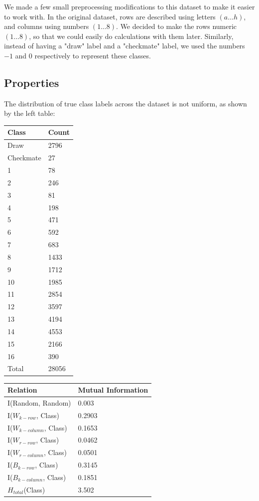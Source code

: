 \documentclass[fleqn]{article}
\begin{document}
We made a few small preprocessing modifications to this dataset to make it easier to work with. In the original dataset, rows are described using letters $(a \dots h)$, and columns using numbers $(1 \dots 8)$. We decided to make the rows numeric $(1 \dots 8)$, so that we could easily do calculations with them later. Similarly, instead of having a "draw" label and a "checkmate" label, we used the numbers $-1$ and $0$ respectively to represent these classes.
%
\subsection{Properties}
\label{subsec:Properties}
The distribution of true class labels across the dataset is not uniform, as shown by the left table:

{\centering
\begin{table}
\hspace{1cm}
\begin{tabular}{ | l | l |}
\hline
\textbf{Class} & \textbf{Count} \\ \hline
Draw & 2796 \\ \hline
Checkmate & 27 \\ \hline
1 & 78 \\ \hline
2 & 246 \\ \hline
3 & 81 \\ \hline
4 & 198 \\ \hline
5 & 471 \\ \hline
6 & 592 \\ \hline
7 & 683 \\ \hline
8 & 1433 \\ \hline
9 & 1712 \\ \hline
10 & 1985 \\ \hline
11 & 2854 \\ \hline
12 & 3597 \\ \hline
13 & 4194 \\ \hline
14 & 4553 \\ \hline
15 & 2166 \\ \hline
16 & 390 \\ \hline \hline
Total & 28056 \\ \hline
\end{tabular}
%
\hspace{2cm}
%
\begin{tabular}{| l | l |}
\hline
\textbf{Relation} & \textbf{Mutual Information} \\ \hline
I(Random, Random) & 0.003 \\ \hline
I($W_{k-row}$, Class) & 0.2903 \\ \hline
I($W_{k-column}$, Class) & 0.1653 \\ \hline
I($W_{r-row}$, Class) & 0.0462 \\ \hline
I($W_{r-column}$, Class) & 0.0501 \\ \hline
I($B_{k-row}$, Class) & 0.3145 \\ \hline
I($B_{k-column}$, Class) & 0.1851 \\ \hline \hline
$H_{total}$(Class) & 3.502 \\ \hline
\end{tabular}
\label{tab:mutalinfo}
\end{table}
}
\end{document}
